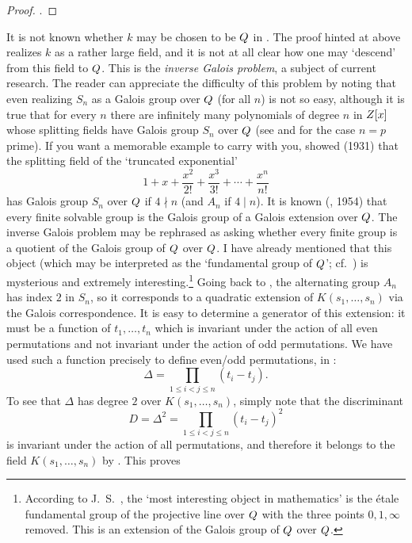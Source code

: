 \begin{proof}
  .
\end{proof}
It is not known whether $k$ may be chosen to be $Q$ in
. The proof hinted at above realizes $k$ as a
rather large field, and it is not at all clear how one may `descend'
from this field to $Q$. This is the \emph{inverse Galois problem}, a
subject of current research. The reader can appreciate the difficulty
of this problem by noting that even realizing $S_n$ as a Galois group
over $Q$ (for all $n$) is not so easy, although it is true that for
every $n$ there are infinitely many polynomials of degree $n$ in
$Z[x]$ whose splitting fields have Galois group $S_n$ over $Q$ (see
 and
 for the
case $n = p$ prime). If you want a memorable example to carry with
you,  showed (1931) that the splitting field of the
`truncated exponential'
\[
  1 + x + \frac{x^2}{2!} + \frac{x^3}{3!} + \cdots + \frac{x^n}{n!}
\]
has Galois group $S_n$ over $Q$ if $4 \nmid n$ (and $A_n$ if
$4 \mid n$).  It is known (, 1954) that every finite
solvable group is the Galois group of a Galois extension over
$Q$. The inverse Galois problem may be rephrased as asking whether
every finite group is a quotient of the Galois group of $Q$ over
$Q$. I have already mentioned that this object (which may be
interpreted as the `fundamental group of $Q$'; cf.\
) is mysterious and extremely
interesting.\footnote{According to J.~S.\ \name{Milne}, the `most
  interesting object in mathematics' is the \'etale fundamental group
  of the projective line over $Q$ with the three points
  $0, 1, \infty$ removed. This is an extension of the Galois group of
  $Q$ over $Q$.}  Going back to , the
alternating group $A_n$ has index $2$ in $S_n$, so it corresponds to a
quadratic extension of $K(s_1, \dots, s_n)$ via the Galois
correspondence. It is easy to determine a generator of this extension:
it must be a function of $t_1, \dots, t_n$ which is invariant under
the action of all even permutations and not invariant under the action
of odd permutations. We have used such a function precisely to define
even/odd permutations, in
:
\[
  \Delta = \prod_{1 \leq i < j \leq n} (t_i - t_j).
\]
To see that $\Delta$ has degree $2$ over $K(s_1, \dots, s_n)$, simply
note that the discriminant
\[
  D = \Delta^2 = \prod_{1 \leq i < j \leq n} (t_i - t_j)^2
\]
is invariant under the action of all permutations, and therefore it
belongs to the field $K(s_1, \dots, s_n)$ by
. This proves

